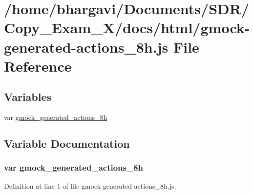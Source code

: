 \hypertarget{gmock-generated-actions__8h_8js}{}\section{/home/bhargavi/\+Documents/\+S\+D\+R/\+Copy\+\_\+\+Exam\+\_\+X/docs/html/gmock-\/generated-\/actions\+\_\+8h.js File Reference}
\label{gmock-generated-actions__8h_8js}
\subsection*{Variables}
\begin{DoxyCompactItemize}
\item 
var \hyperlink{gmock-generated-actions__8h_8js_a72ae2bb36c62fcd54892f5ab6e03bdbc}{gmock\+\_\+generated\+\_\+actions\+\_\+8h}
\end{DoxyCompactItemize}


\subsection{Variable Documentation}
\subsubsection[{\texorpdfstring{gmock\+\_\+generated\+\_\+actions\+\_\+8h}{gmock_generated_actions_8h}}]{\setlength{\rightskip}{0pt plus 5cm}var gmock\+\_\+generated\+\_\+actions\+\_\+8h}\hypertarget{gmock-generated-actions__8h_8js_a72ae2bb36c62fcd54892f5ab6e03bdbc}{}\label{gmock-generated-actions__8h_8js_a72ae2bb36c62fcd54892f5ab6e03bdbc}


Definition at line 1 of file gmock-\/generated-\/actions\+\_\+8h.\+js.

